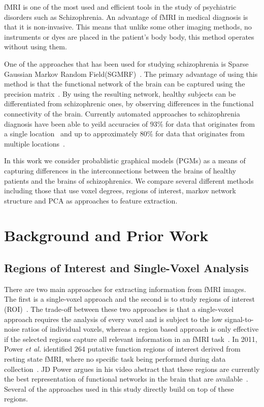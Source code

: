 \documentclass{article} %
\begin{document}
fMRI is one of the most used and efficient tools in the study of 
psychiatric disorders such as Schizophrenia\cite{}. An advantage of fMRI in
medical diagnosis is that it is non-invasive. This means that unlike some 
other imaging methods, no instruments or dyes are placed in the patient’s body
body, this method operates without using them\cite{}. 

One of the approaches that has been used for studying schizophrenia is 
Sparse Gaussian Markov Random Field(SGMRF)~\cite{Rish_2013}\cite{Rosa_2013}. 
The primary advantage of using this method is that the functional network of 
the brain can be captured using the precision matrix~\cite{Rish_2013}.
By using the resulting network, healthy subjects can be differentiated from 
schizophrenic ones, by observing differences in the functional connectivity 
of the brain. Currently automated approaches to schizophrenia
diagnosis have been able to yeild accuracies of $93\%$ for data that 
originates from a single location~\cite{Rish_2013} and up to approximately 
$80\%$ for data that originates from multiple locations~\cite{Cheng2015}.

In this work we consider probablistic graphical models (PGMs) as a means
of capturing differences in the interconnections between the brains of
healthy patients and the brains of schizophrenics. We compare several 
different methods including those that use voxel degrees, regions of 
interest, markov network structure and PCA as approaches to feature
extraction.

\section{Background and Prior Work}

\subsection{Regions of Interest and Single-Voxel Analysis}
There are two main approaches for extracting
information from fMRI images. The first is a single-voxel approach and 
the second is to study regions of interest (ROI)~\cite{heller2006cluster}. 
The trade-off between these two approaches is that a single-voxel approach
requires the analysis of every voxel and is subject to the low signal-to-noise 
ratios of individual voxels, whereas a region based approach is only
effective if the selected regions capture all relevant information in an fMRI 
task~\cite{heller2006cluster}. In 2011, Power \emph{et al.} identified 264 
putative function regions of interest derived from resting state fMRI, where 
no specific task being performed during data collection~\cite{Power_2011}. 
JD Power argues in his video abstract that these regions are currently the
best representation of functional networks in the brain that are
available~\cite{Power_2011}. Several of the approaches used in this study
directly build on top of these regions.
\end{document}
